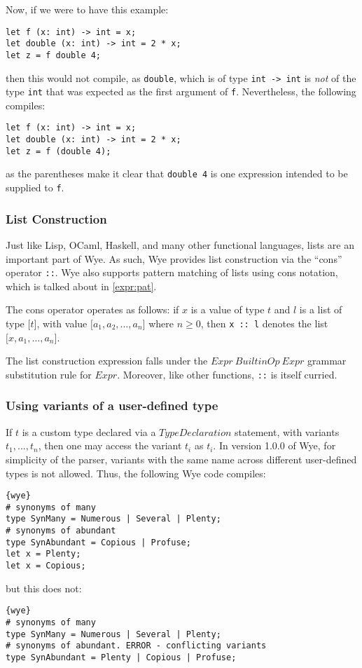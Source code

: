 \documentclass[a4paper, 12pt]{article}
\newcommand{\version}{1.0.0}
\begin{document}
Now, if we were to have this example:
\begin{lstlisting}
let f (x: int) -> int = x;
let double (x: int) -> int = 2 * x;
let z = f double 4;
\end{lstlisting}
then this would not compile, as \texttt{double}, which is of type \texttt{int -> int} is \textit{not} of the type \texttt{int} that was expected as the first argument of \texttt{f}. Nevertheless, the following compiles:
\begin{lstlisting}
let f (x: int) -> int = x;
let double (x: int) -> int = 2 * x;
let z = f (double 4);
\end{lstlisting}
as the parentheses make it clear that \texttt{double 4} is one expression intended to be supplied to \texttt{f}.

\subsubsection{List Construction}\label{expr:cons}
Just like Lisp, OCaml, Haskell, and many other functional languages, lists are an important part of Wye. As such, Wye provides list construction via the ``cons'' operator \texttt{::}. Wye also supports pattern matching of lists using cons notation, which is talked about in \ref{expr:pat}.

The cons operator operates as follows: if $x$ is a value of type $t$ and $l$ is a list of type $\texttt{[}t\texttt{]}$, with value $\texttt{[}a_1, a_2, ..., a_n\texttt{]}$ where $n\geq 0$, then \texttt{x :: l} denotes the list $\texttt{[}x, a_1, ..., a_n\texttt{]}$.

The list construction expression falls under the $Expr\: BuiltinOp\: Expr$ grammar substitution rule for $Expr$. Moreover, like other functions, \texttt{::} is itself curried.

\subsubsection{Using variants of a user-defined type}
If $t$ is a custom type declared via a $TypeDeclaration$ statement, with variants $t_1, ..., t_n$, then one may access the variant $t_i$ as $t_i$. In version \version{} of Wye, for simplicity of the parser, variants with the same name across different user-defined types is not allowed. Thus, the following Wye code compiles:
\begin{lstlisting}{wye}
# synonyms of many
type SynMany = Numerous | Several | Plenty;
# synonyms of abundant
type SynAbundant = Copious | Profuse;
let x = Plenty;
let x = Copious;
\end{lstlisting}
but this does not:
\begin{lstlisting}{wye}
# synonyms of many
type SynMany = Numerous | Several | Plenty;
# synonyms of abundant. ERROR - conflicting variants
type SynAbundant = Plenty | Copious | Profuse;
\end{lstlisting}
\end{document}
